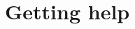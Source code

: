 \documentclass[12pt,twoside]{article}   %
\begin{document}
\clearpage

%
%
%
%

\section{Getting help}
\label{help}
\end{document}

